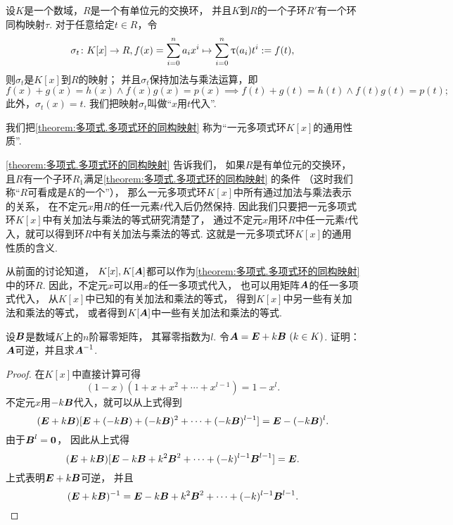 \begin{theorem}\label{theorem:多项式.多项式环的同构映射}
设\(K\)是一个数域，\(R\)是一个有单位元的交换环，
并且\(K\)到\(R\)的一个子环\(R'\)有一个环同构映射\(\tau\).
对于任意给定\(t \in R\)，令\begin{equation*}
	\sigma_t\colon
	K[x] \to R,
	f(x)=\sum_{i=0}^n a_i x^i \mapsto \sum_{i=0}^n \uptau(a_i) t^i := f(t),
\end{equation*}
则\(\sigma_t\)是\(K[x]\)到\(R\)的映射；
并且\(\sigma_t\)保持加法与乘法运算，即\begin{equation*}
	f(x)+g(x)=h(x) \land f(x) g(x) = p(x)
	\implies
	f(t)+g(t)=h(t) \land f(t) g(t) = p(t);
\end{equation*}
此外，\(\sigma_t(x) = t\).
我们把映射\(\sigma_t\)叫做“\(x\)用\(t\)代入”.
\end{theorem}

我们把\cref{theorem:多项式.多项式环的同构映射}
称为“一元多项式环\(K[x]\)的通用性质”.

\cref{theorem:多项式.多项式环的同构映射} 告诉我们，
如果\(R\)是有单位元的交换环，
且\(R\)有一个子环\(R_1\)满足\cref{theorem:多项式.多项式环的同构映射} 的条件
（这时我们称“\(R\)可看成是\(K\)的一个”），
那么一元多项式环\(K[x]\)中所有通过加法与乘法表示的关系，
在不定元\(x\)用\(R\)的任一元素\(t\)代入后仍然保持.
因此我们只要把一元多项式环\(K[x]\)中有关加法与乘法的等式研究清楚了，
通过不定元\(x\)用环\(R\)中任一元素\(t\)代入，就可以得到环\(R\)中有关加法与乘法的等式.
这就是一元多项式环\(K[x]\)的通用性质的含义.

从前面的讨论知道，
\(K[x],K[\boldsymbol{A}]\)都可以作为\cref{theorem:多项式.多项式环的同构映射} 中的环\(R\).
因此，不定元\(x\)可以用\(x\)的任一多项式代入，
也可以用矩阵\(\boldsymbol{A}\)的任一多项式代入，
从\(K[x]\)中已知的有关加法和乘法的等式，
得到\(K[x]\)中另一些有关加法和乘法的等式，
或者得到\(K[\boldsymbol{A}]\)中一些有关加法和乘法的等式.

\begin{example}
设\(\boldsymbol{B}\)是数域\(K\)上的\(n\)阶幂零矩阵，
其幂零指数为\(l\).
令\(\boldsymbol{A}=\boldsymbol{E}+k\boldsymbol{B}\ (k \in K)\).
证明：\(\boldsymbol{A}\)可逆，并且求\(\boldsymbol{A}^{-1}\).
\begin{proof}
在\(K[x]\)中直接计算可得\begin{equation*}
	(1-x)(1+x+x^2+\dotsb+x^{l-1})
	=1-x^l.
\end{equation*}
不定元\(x\)用\(-k\boldsymbol{B}\)代入，就可以从上式得到\begin{equation*}
	(\boldsymbol{E}+k\boldsymbol{B})[\boldsymbol{E}+(-k\boldsymbol{B})+(-k\boldsymbol{B})^2+\dotsb+(-k\boldsymbol{B})^{l-1}]
	=\boldsymbol{E}-(-k\boldsymbol{B})^l.
\end{equation*}
由于\(\boldsymbol{B}^l=\boldsymbol0\)，
因此从上式得\begin{equation*}
	(\boldsymbol{E}+k\boldsymbol{B})[\boldsymbol{E}-k\boldsymbol{B}+k^2\boldsymbol{B}^2+\dotsb+(-k)^{l-1}\boldsymbol{B}^{l-1}]
	=\boldsymbol{E}.
\end{equation*}
上式表明\(\boldsymbol{E}+k\boldsymbol{B}\)可逆，
并且\begin{equation*}
	(\boldsymbol{E}+k\boldsymbol{B})^{-1}
	= \boldsymbol{E}-k\boldsymbol{B}+k^2\boldsymbol{B}^2+\dotsb+(-k)^{l-1}\boldsymbol{B}^{l-1}.
	\qedhere
\end{equation*}
\end{proof}
\end{example}
